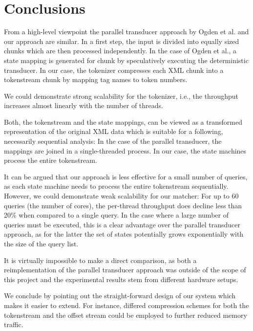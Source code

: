 \section{Conclusions}

From a high-level viewpoint the parallel transducer approach by Ogden et al.
\cite{Ogden2013} and our approach are similar. In a first step, the input is
divided into equally sized chunks which are then processed independently. In the
case of Ogden et al., a state mapping is generated for chunk by speculatively
executing the deterministic transducer. In our case, the tokenizer compresses
each XML chunk into a tokenstream chunk by mapping tag names to token numbers.

We could demonstrate strong scalability for the tokenizer, i.e., the throughput
increases almost linearly with the number of threads.

Both, the tokenstream and the state mappings, can be viewed as a transformed
representation of the original XML data which is suitable for a following,
necessarily sequential analysis: In the case of the parallel transducer, the
mappings are joined in a single-threaded process. In our case, the state
machines process the entire tokenstream.

It can be argued that our approach is less effective for a small number of
queries, as each state machine needs to process the entire tokenstream
sequentially. However, we could demonstrate weak scalability for our matcher:
For up to 60 queries (the number of cores), the per-thread throughput does
decline less than 20\% when compared to a single query. In the case where
a large number of queries must be executed, this is a clear advantage over the
parallel transducer approach, as for the latter the set of states potentially
grows exponentially with the size of the query list.

It is virtually impossible to make a direct comparison, as both a
reimplementation of the parallel transducer approach was outside of the scope of
this project and the experimental results stem from different hardware setups.

We conclude by pointing out the straight-forward design of our system which
makes it easier to extend. For instance, differed compression schemes for both
the tokenstream and the offset stream could be employed to further reduced
memory traffic.
